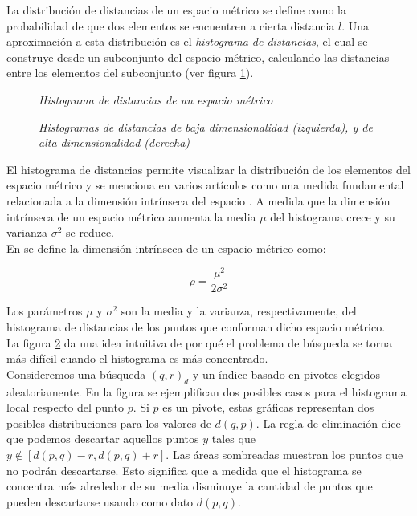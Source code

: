 La distribuci\'on de distancias de un espacio m\'etrico se define como la probabilidad de que dos elementos se encuentren a cierta distancia $l$. Una aproximaci\'on a esta distribuci\'on es el \textit{histograma de distancias}, el cual se construye desde un subconjunto del espacio m\'etrico, calculando las distancias entre los elementos del subconjunto (ver figura \ref{defineH}).\\
 
 \begin{figure}[tb!]
\centerline{%
  }
  \caption [Histograma de distancias de un espacio m\'etrico]
  {\footnotesize {\textsl {Histograma de distancias de un espacio m\'etrico}}}
\label{defineH}
\end{figure}
\begin{figure}[tb]
  \centerline{%
    }
    \caption [Histogramas de distancias de baja y
               alta dimensionalidad]
      { \textsl{\footnotesize Histogramas de distancias de baja dimensionalidad
                  (izquierda), y  de alta dimensionalidad (derecha)}}
  \label{dim1}
  \end{figure}

El histograma de distancias permite visualizar la distribuci\'on de los elementos del espacio m\'etrico y se menciona en varios art\'iculos como una medida fundamental relacionada a la dimensi\'on intr\'inseca del espacio \cite{Bri95, CM97, cn00,alenex,CPZ98a}. A medida que la dimensi\'on intr\'inseca de un espacio m\'etrico aumenta la media  $\mu$ del histograma crece y su varianza $\sigma^{2}$ se reduce.\\

\noindent En \cite{oursurvey} se define la dimensi\'on intr\'inseca de un espacio m\'etrico como:

\[
\rho = \frac{\mu^2}{2\sigma^2}
\]

Los par\'ametros $\mu$ y $\sigma^2$ son la media y la varianza, respectivamente, del histograma de distancias de los puntos que conforman dicho espacio m\'etrico.\\

La figura \ref{dim1} da una idea intuitiva de por qu\'e el problema de b\'usqueda se torna m\'as dif\'icil cuando el histograma es m\'as concentrado.\\

Consideremos una b\'usqueda $(q,r)_{d}$ y un \'indice basado en pivotes elegidos aleatoriamente. En la figura se ejemplifican dos posibles casos para el histograma local respecto del punto $p$. Si $p$ es un pivote, estas gr\'aficas representan dos posibles distribuciones para los valores de $d(q,p)$. La regla de eliminaci\'on dice que podemos descartar aquellos puntos $y$ tales que  $y \notin [d(p,q)-r, d(p,q) + r]$. Las \'areas sombreadas muestran  los puntos que no podr\'an descartarse. Esto significa que a medida que el histograma se concentra m\'as alrededor de su media disminuye la cantidad de puntos que pueden descartarse usando como dato $d(p,q)$.\\

